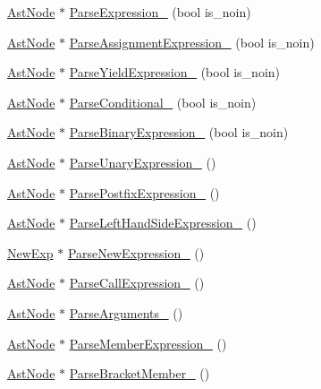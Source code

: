 \begin{DoxyCompactItemize}
\item 
\hyperlink{classmocha_1_1_ast_node}{AstNode} $\ast$ \hyperlink{classmocha_1_1_parser_a190a87e325017c5e3cd77920542b52c2}{ParseExpression\_\-} (bool is\_\-noin)
\item 
\hyperlink{classmocha_1_1_ast_node}{AstNode} $\ast$ \hyperlink{classmocha_1_1_parser_a55b07286decbf2fd6915186716b8f12a}{ParseAssignmentExpression\_\-} (bool is\_\-noin)
\item 
\hyperlink{classmocha_1_1_ast_node}{AstNode} $\ast$ \hyperlink{classmocha_1_1_parser_a6c49ef7a770e4ba2245aaf42a2e7a6df}{ParseYieldExpression\_\-} (bool is\_\-noin)
\item 
\hyperlink{classmocha_1_1_ast_node}{AstNode} $\ast$ \hyperlink{classmocha_1_1_parser_abb27789507274f7db8fab2ffe464f761}{ParseConditional\_\-} (bool is\_\-noin)
\item 
\hyperlink{classmocha_1_1_ast_node}{AstNode} $\ast$ \hyperlink{classmocha_1_1_parser_a7b610bc4783a6d74214cd169f5841d82}{ParseBinaryExpression\_\-} (bool is\_\-noin)
\item 
\hyperlink{classmocha_1_1_ast_node}{AstNode} $\ast$ \hyperlink{classmocha_1_1_parser_a5186b19a3b0e0d36db2a137a02865e0a}{ParseUnaryExpression\_\-} ()
\item 
\hyperlink{classmocha_1_1_ast_node}{AstNode} $\ast$ \hyperlink{classmocha_1_1_parser_a80f9f4df1a87dcee51c40d1093ec8008}{ParsePostfixExpression\_\-} ()
\item 
\hyperlink{classmocha_1_1_ast_node}{AstNode} $\ast$ \hyperlink{classmocha_1_1_parser_a13d969a0722c06ec886ad59d1f51b208}{ParseLeftHandSideExpression\_\-} ()
\item 
\hyperlink{classmocha_1_1_new_exp}{NewExp} $\ast$ \hyperlink{classmocha_1_1_parser_af95a894c4a10be17b645e55f878169ec}{ParseNewExpression\_\-} ()
\item 
\hyperlink{classmocha_1_1_ast_node}{AstNode} $\ast$ \hyperlink{classmocha_1_1_parser_a36f8042788081db2259918ff23c934bc}{ParseCallExpression\_\-} ()
\item 
\hyperlink{classmocha_1_1_ast_node}{AstNode} $\ast$ \hyperlink{classmocha_1_1_parser_adbbbed3bc0a0d9425343b645ac44b7b7}{ParseArguments\_\-} ()
\item 
\hyperlink{classmocha_1_1_ast_node}{AstNode} $\ast$ \hyperlink{classmocha_1_1_parser_a2a1a3814950c8db77d1dcb16a31c84fc}{ParseMemberExpression\_\-} ()
\item 
\hyperlink{classmocha_1_1_ast_node}{AstNode} $\ast$ \hyperlink{classmocha_1_1_parser_aae28eb3fff2f671ef65445351a2b3925}{ParseBracketMember\_\-} ()

\end{DoxyCompactItemize}
